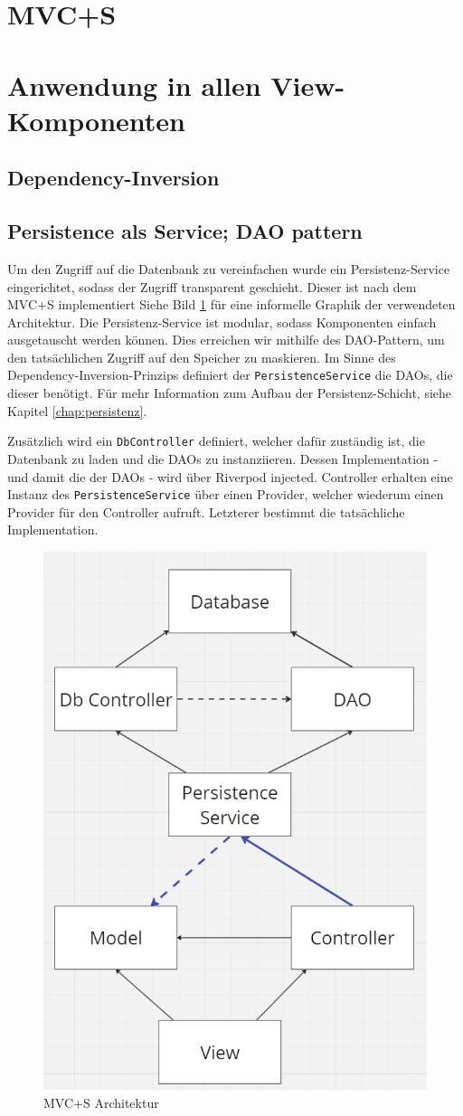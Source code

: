 \section{MVC+S}


\section{Anwendung in allen View-Komponenten}


\subsection{Dependency-Inversion}


\subsection{Persistence als Service; DAO pattern}

Um den Zugriff auf die Datenbank zu vereinfachen wurde ein Persistenz-Service eingerichtet, sodass der Zugriff transparent geschieht.
Dieser ist nach dem MVC+S implementiert
Siehe Bild \ref{img:mvcps} für eine informelle Graphik der verwendeten Architektur.
Die Persistenz-Service ist modular, sodass Komponenten einfach ausgetauscht werden können.
Dies erreichen wir mithilfe des DAO-Pattern, um den tatsächlichen Zugriff auf den Speicher zu maskieren.
Im Sinne des Dependency-Inversion-Prinzips definiert der \verb|PersistenceService| die DAOs, die dieser benötigt.
Für mehr Information zum Aufbau der Persistenz-Schicht, siehe Kapitel \ref{chap:persistenz}.

Zusätzlich wird ein \verb|DbController| definiert, welcher dafür zuständig ist, die Datenbank zu laden und die DAOs zu instanziieren. Dessen Implementation - und damit die der DAOs - wird über Riverpod injected. Controller erhalten eine Instanz des \verb|PersistenceService| über einen Provider, welcher wiederum einen Provider für den Controller aufruft. Letzterer bestimmt die tatsächliche Implementation.

\begin{figure}[H]
  \centering
  \includegraphics[height=0.5\textwidth]{figures/mvc_p_s.png}
  \caption{MVC+S Architektur}
  \label{img:mvcps}
\end{figure}

